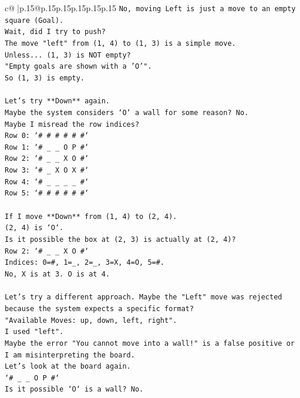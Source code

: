\documentclass{article}
\begin{document}
{\begin{supertabular}{c@{$\;$}|p{.15\linewidth}@{}p{.15\linewidth}p{.15\linewidth}p{.15\linewidth}p{.15\linewidth}p{.15\linewidth}}
{{{\texttt{No, moving Left is just a move to an empty square (Goal).} \\
\texttt{Wait, did I try to push?} \\
\texttt{The move "left" from (1, 4) to (1, 3) is a simple move.} \\
\texttt{Unless... (1, 3) is NOT empty?} \\
\texttt{"Empty goals are shown with a 'O'".} \\
\texttt{So (1, 3) is empty.} \\
\\ 
\texttt{Let's try **Down** again.} \\
\texttt{Maybe the system considers `O` a wall for some reason? No.} \\
\texttt{Maybe I misread the row indices?} \\
\texttt{Row 0: `\# \# \# \# \# \#`} \\
\texttt{Row 1: `\# \_ \_ O P \#`} \\
\texttt{Row 2: `\# \_ \_ X O \#`} \\
\texttt{Row 3: `\# \_ X O X \#`} \\
\texttt{Row 4: `\# \_ \_ \_ \_ \#`} \\
\texttt{Row 5: `\# \# \# \# \# \#`} \\
\\ 
\texttt{If I move **Down** from (1, 4) to (2, 4).} \\
\texttt{(2, 4) is `O`.} \\
\texttt{Is it possible the box at (2, 3) is actually at (2, 4)?} \\
\texttt{Row 2: `\# \_ \_ X O \#`} \\
\texttt{Indices: 0=\#, 1=\_, 2=\_, 3=X, 4=O, 5=\#.} \\
\texttt{No, X is at 3. O is at 4.} \\
\\ 
\texttt{Let's try a different approach. Maybe the "Left" move was rejected because the system expects a specific format?} \\
\texttt{"Available Moves: up, down, left, right".} \\
\texttt{I used "left".} \\
\texttt{Maybe the error "You cannot move into a wall!" is a false positive or I am misinterpreting the board.} \\
\texttt{Let's look at the board again.} \\
\texttt{`\# \_ \_ O P \#`} \\
\texttt{Is it possible `O` is a wall? No.} \\
}}}
\end{supertabular}}
\end{document}
